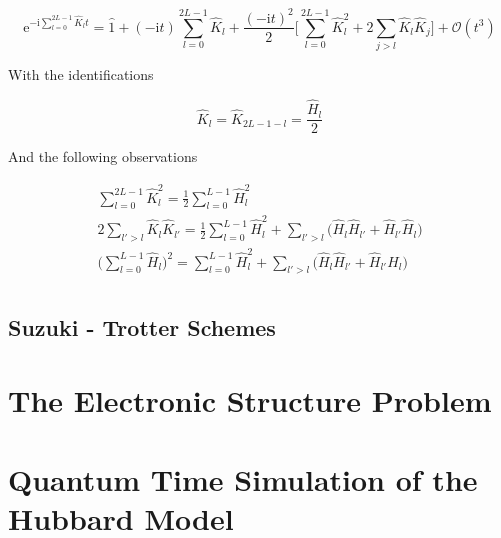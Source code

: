   \begin{equation}
    \mathrm{e}^{-\mathrm{i}\sum_{l = 0}^{2L-1} \hat{K}_l t} = \hat{1} + (-\mathrm{i}t)\sum_{l = 0}^{2L-1} \hat{K}_l + \frac{(-\mathrm{i}t)^2}{2} \Bigg[\sum_{l = 0}^{2L-1} \hat{K}_l^2 + 2 \sum_{j > l}\hat{K}_l \hat{K}_j\Bigg] + \mathcal{O}(t^3)
    \label{eq:TrotterFormula1}
  \end{equation}

  With the identifications

  \begin{equation}
    \hat{K}_l = \hat{K}_{2L-1-l} = \frac{\hat{H}_l}{2}
    \label{eq:Identifications}
  \end{equation}

  And the following observations

  \begin{equation}
    \begin{gathered}
      \sum_{l = 0}^{2L-1} \hat{K}_l^2 = \frac{1}{2}\sum_{l = 0}^{L-1} \hat{H}_l^2 \\
      2\sum_{l' > l} \hat{K}_{l} \hat{K}_{l'} = \frac{1}{2}\sum_{l = 0}^{L-1} \hat{H}_l^2 + \sum_{l'> l} \Bigg( \hat{H}_{l} \hat{H}_{l'} + \hat{H}_{l'} \hat{H}_{l}\Bigg)\\
      \Bigg(\sum_{l = 0}^{L-1} \hat{H}_l \Bigg)^2 = \sum_{l = 0}^{L-1} \hat{H}_l^2 + \sum_{l'> l} \Bigg( \hat{H}_{l} \hat{H}_{l'} + \hat{H}_{l'} \hat{H}_{l}\Bigg)\\
    \end{gathered}
  \end{equation}

  \subsection{Suzuki - Trotter Schemes}
  \lipsum[2-4]


\section{The Electronic Structure Problem}
  \lipsum[2-4]

\section{Quantum Time Simulation of the Hubbard Model}
  \lipsum[2-4]
